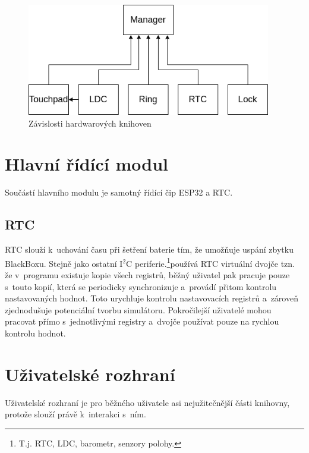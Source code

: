 \begin{figure}[h]
    \begin{small}
        \begin{center}
            \includegraphics[width=0.95\textwidth]{img/manager.png}
        \end{center}
        \caption{Závislosti hardwarových knihoven}
        \label{fig:hLibs}
    \end{small}
\end{figure}

\section{Hlavní řídící modul}

Součástí hlavního modulu je samotný řídící čip ESP32 a RTC.

\subsection{RTC}\label{ss:rtc}

RTC slouží k~uchování času při šetření baterie tím, že umožňuje uspání zbytku BlackBoxu.
Stejně jako ostatní I$^2$C periferie.\footnote{T.j. RTC, LDC, barometr, senzory polohy.}používá RTC virtuální dvojče tzn. že v~programu existuje kopie všech registrů, běžný uživatel pak pracuje pouze s~touto kopií, která se periodicky synchronizuje a~provádí přitom kontrolu nastavovaných hodnot.
Toto urychluje kontrolu nastavovacích registrů a~zároveň zjednodušuje potenciální tvorbu simulátoru.
Pokročilejší uživatelé mohou pracovat přímo s~jednotlivými registry a~dvojče používat pouze na rychlou kontrolu hodnot.

\section{Uživatelské rozhraní}

Uživatelské rozhraní je pro běžného uživatele asi nejužitečnější části knihovny, protože slouží právě k~interakci s~ním.

